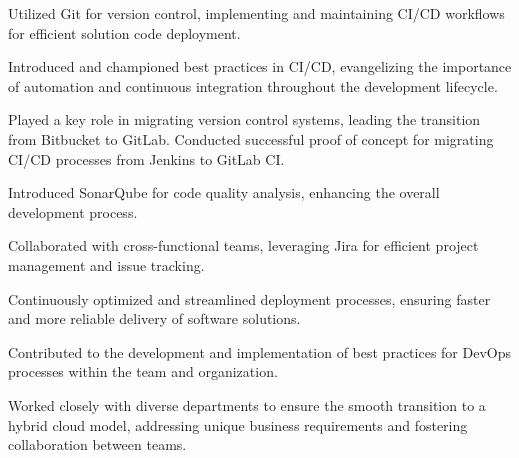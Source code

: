 \begin{cventries}
{\begin{cvitems}
        \item {Utilized Git for version control, implementing and maintaining CI/CD workflows for efficient solution code deployment.}
        \item {Introduced and championed best practices in CI/CD, evangelizing the importance of automation and continuous integration throughout the development lifecycle.}
        \item {Played a key role in migrating version control systems, leading the transition from Bitbucket to GitLab. Conducted successful proof of concept for migrating CI/CD processes from Jenkins to GitLab CI.}
        \item {Introduced SonarQube for code quality analysis, enhancing the overall development process.}
        \item {Collaborated with cross-functional teams, leveraging Jira for efficient project management and issue tracking.}
        \item {Continuously optimized and streamlined deployment processes, ensuring faster and more reliable delivery of software solutions.}
        \item {Contributed to the development and implementation of best practices for DevOps processes within the team and organization.}
        \item {Worked closely with diverse departments to ensure the smooth transition to a hybrid cloud model, addressing unique business requirements and fostering collaboration between teams.}
        \end{cvitems}
        
    }


\end{cventries}
